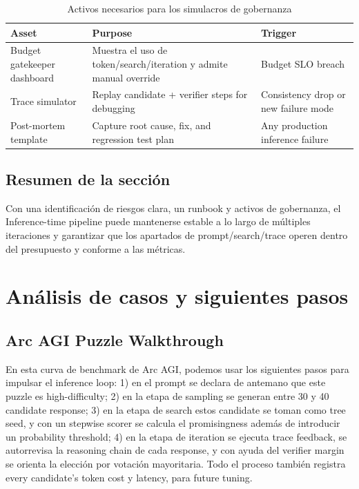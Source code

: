 \documentclass[a4paper]{article}
\begin{document}
\begin{table}[H]
\centering
\caption{Activos necesarios para los simulacros de gobernanza}
\begin{tabular}{p{}p{}p{}}
\toprule
Asset & Purpose & Trigger \\
\midrule
Budget gatekeeper dashboard & Muestra el uso de token/search/iteration y admite manual override & Budget SLO breach \\
Trace simulator & Replay candidate + verifier steps for debugging & Consistency drop or new failure mode \\
Post-mortem template & Capture root cause, fix, and regression test plan & Any production inference failure \\
\bottomrule
\end{tabular}
\end{table}

\subsection{Resumen de la sección}
Con una identificación de riesgos clara, un runbook y activos de gobernanza, el Inference-time pipeline puede mantenerse estable a lo largo de múltiples iteraciones y garantizar que los apartados de prompt/search/trace operen dentro del presupuesto y conforme a las métricas.
\section{Análisis de casos y siguientes pasos}

\subsection{Arc AGI Puzzle Walkthrough}
En esta curva de benchmark de Arc AGI, podemos usar los siguientes pasos para impulsar el inference loop: 1) en el prompt se declara de antemano que este puzzle es high-difficulty; 2) en la etapa de sampling se generan entre 30 y 40 candidate response; 3) en la etapa de search estos candidate se toman como tree seed, y con un stepwise scorer se calcula el promisingness además de introducir un probability threshold; 4) en la etapa de iteration se ejecuta trace feedback, se autorrevisa la reasoning chain de cada response, y con ayuda del verifier margin se orienta la elección por votación mayoritaria. Todo el proceso también registra every candidate's token cost y latency, para future tuning.
\end{document}
